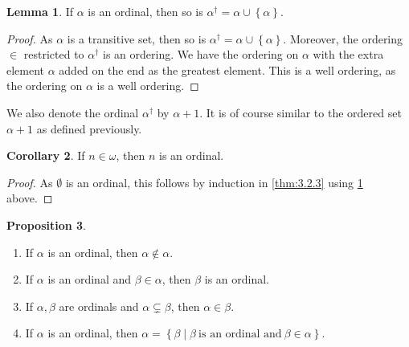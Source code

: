 \documentclass{article}
\newcommand{\cb}[1]{\left\{ #1 \right\}}
\theoremstyle{definition}\newtheorem{definition}{Definition}[subsection]
\theoremstyle{definition}\newtheorem{remark1}[definition]{Remark}
\theoremstyle{definition}\newtheorem{example1}[definition]{Example}
\theoremstyle{definition}\newtheorem*{remark2}{Remark}
\theoremstyle{definition}\newtheorem*{example2}{Example}
\theoremstyle{definition}\newtheorem*{note}{Note}
\theoremstyle{definition}\newtheorem*{notation}{Notation}
\newtheorem{proposition}[definition]{Proposition}
\newtheorem{lemma}[definition]{Lemma}
\newtheorem{corollary}[definition]{Corollary}
\begin{document}
\begin{lemma}
\label{lem:3.4.2}
If $ \alpha $ is an ordinal, then so is $ \alpha^\dagger = \alpha \cup \cb{\alpha} $.
\end{lemma}

\begin{proof}
As $ \alpha $ is a transitive set, then so is $ \alpha^\dagger = \alpha \cup \cb{\alpha} $. Moreover, the ordering $ \in $ restricted to $ \alpha^\dagger $ is an ordering. We have the ordering on $ \alpha $ with the extra element $ \alpha $ added on the end as the greatest element. This is a well ordering, as the ordering on $ \alpha $ is a well ordering.
\end{proof}

We also denote the ordinal $ \alpha^\dagger $ by $ \alpha + 1 $. It is of course similar to the ordered set $ \alpha + 1 $ as defined previously.

\begin{corollary}
If $ n \in \omega $, then $ n $ is an ordinal.
\end{corollary}

\begin{proof}
As $ \emptyset $ is an ordinal, this follows by induction in \ref{thm:3.2.3} using \ref{lem:3.4.2} above.
\end{proof}

\begin{proposition}
\label{prop:3.4.4}
\hfill
\begin{enumerate}
\item If $ \alpha $ is an ordinal, then $ \alpha \notin \alpha $.
\item If $ \alpha $ is an ordinal and $ \beta \in \alpha $, then $ \beta $ is an ordinal.
\item If $ \alpha, \beta $ are ordinals and $ \alpha \subsetneq \beta $, then $ \alpha \in \beta $.
\item If $ \alpha $ is an ordinal, then $ \alpha = \cb{\beta \mid \beta \ \text{is an ordinal and} \ \beta \in \alpha} $.
\end{enumerate}
\end{proposition}
\end{document}
